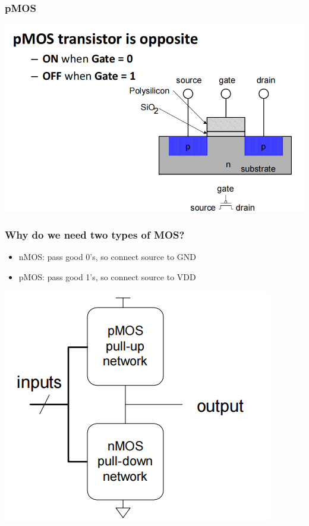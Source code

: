 \documentclass[12pt]{article}
\begin{document}
\subsubsection{pMOS}
\includegraphics[width=\textwidth]{pMOS.png}
\subsubsection{Why do we need two types of MOS?}
\begin{itemize}
    \item nMOS: pass good 0's, so connect source to GND
    \item pMOS: pass good 1's, so connect source to VDD
\end{itemize}
\includegraphics[width=\textwidth]{TransistorFunction.png}
\end{document}

